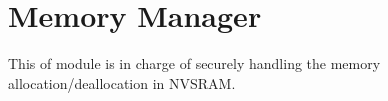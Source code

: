 \hypertarget{group__ssbx___mem}{}\section{Memory Manager}
\label{group__ssbx___mem}
This of module is in charge of securely handling the memory allocation/deallocation in N\+V\+S\+R\+AM. 